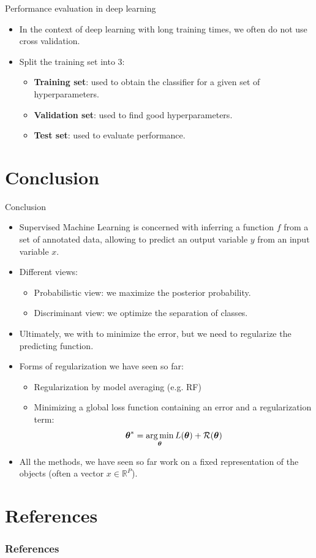 \documentclass[xcolor=pdftex,dvipsnames,table]{beamer}
\begin{document}
\begin{frame}{Performance evaluation in deep learning}
	\begin{itemize}
		\item In the context of deep learning with long training times, we often do not use cross validation.
		\item Split the training set into 3:
		\begin{itemize}
			\item {\bf Training set}: used to obtain the classifier for a given set of hyperparameters.
			\item {\bf Validation set}: used to find good hyperparameters.
			\item {\bf Test set}: used to evaluate performance. 
		\end{itemize}
	\end{itemize}
\end{frame}


\section{Conclusion}
\begin{frame}{Conclusion}
	\begin{itemize}
		\item Supervised Machine Learning is concerned with inferring a function $f$ from a set of annotated data, allowing to predict an output variable $y$ from an input variable $x$.
		\item Different views:
			\begin{itemize}
				\item Probabilistic view: we maximize the posterior probability.
				\item Discriminant view: we optimize the separation of classes.
			\end{itemize}
		\item Ultimately, we with to minimize the error, but we need to regularize the predicting function.
		\item Forms of regularization we have seen so far:
			\begin{itemize}
				\item Regularization by model averaging (e.g. RF)
				\item Minimizing a global loss function containing an error and a regularization term: 
				\begin{equation*}
					\boldsymbol{\theta} ^{\ast} = \operatorname*{arg\,min}_{\boldsymbol{\theta}} L (\boldsymbol{\theta}) + \mathcal{R}(\boldsymbol{\theta})
				\end{equation*}
			\end{itemize}
		\item All the methods, we have seen so far work on a fixed representation of the objects (often a vector $x \in\mathbb{R}^P$).
	\end{itemize}
\end{frame}


\section{References}
\begin{frame}[allowframebreaks]
	\frametitle{References}
	
\end{frame}
\end{document}
